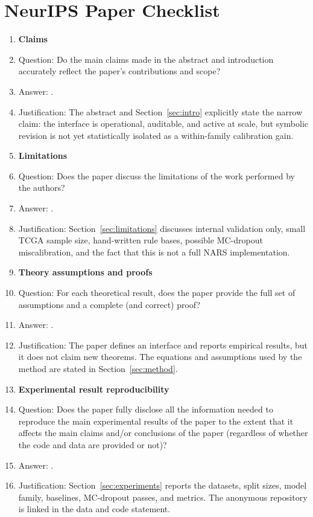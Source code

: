 \section*{NeurIPS Paper Checklist}

\begin{enumerate}

\item {\bf Claims}
    \item[] Question: Do the main claims made in the abstract and introduction accurately reflect the paper's contributions and scope?
    \item[] Answer: \answerYes{}.
    \item[] Justification: The abstract and Section~\ref{sec:intro} explicitly state the narrow claim: the interface is operational, auditable, and active at scale, but symbolic revision is not yet statistically isolated as a within-family calibration gain.

\item {\bf Limitations}
    \item[] Question: Does the paper discuss the limitations of the work performed by the authors?
    \item[] Answer: \answerYes{}.
    \item[] Justification: Section~\ref{sec:limitations} discusses internal validation only, small TCGA sample size, hand-written rule bases, possible MC-dropout miscalibration, and the fact that this is not a full NARS implementation.

\item {\bf Theory assumptions and proofs}
    \item[] Question: For each theoretical result, does the paper provide the full set of assumptions and a complete (and correct) proof?
    \item[] Answer: \answerNA{}.
    \item[] Justification: The paper defines an interface and reports empirical results, but it does not claim new theorems. The equations and assumptions used by the method are stated in Section~\ref{sec:method}.

\item {\bf Experimental result reproducibility}
    \item[] Question: Does the paper fully disclose all the information needed to reproduce the main experimental results of the paper to the extent that it affects the main claims and/or conclusions of the paper (regardless of whether the code and data are provided or not)?
    \item[] Answer: \answerYes{}.
    \item[] Justification: Section~\ref{sec:experiments} reports the datasets, split sizes, model family, baselines, MC-dropout passes, and metrics. The anonymous repository is linked in the data and code statement.


\end{enumerate}
